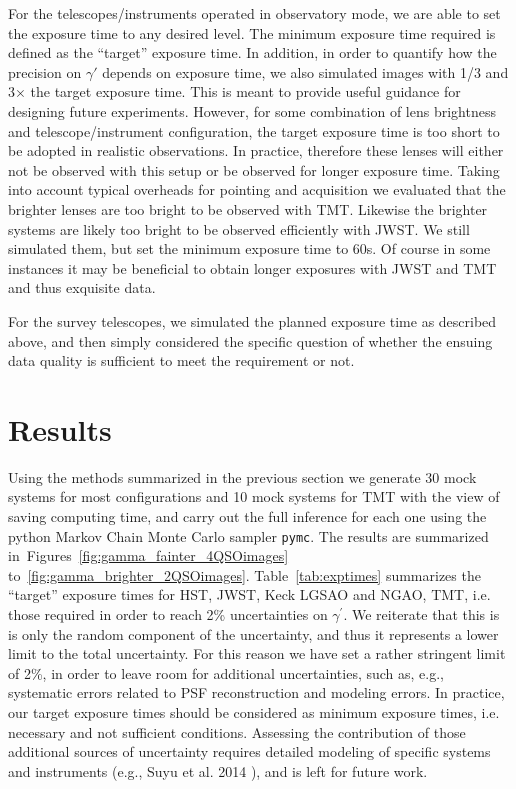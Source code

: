 \documentclass[a4paper,11pt]{article}
\begin{document}
For the telescopes/instruments operated in observatory mode, we are
able to set the exposure time to any desired level. The minimum
exposure time required is defined as the ``target'' exposure time. In
addition, in order to quantify how the precision on $\gamma'$ depends
on exposure time, we also simulated images with 1/3 and 3$\times$ the
target exposure time. This is meant to provide useful guidance for
designing future experiments. However, for some combination of lens
brightness and telescope/instrument configuration, the target exposure
time is too short to be adopted in realistic observations. In
practice, therefore these lenses will either not be observed with this
setup or be observed for longer exposure time. Taking into account
typical overheads for pointing and acquisition we evaluated that the
brighter lenses are too bright to be observed with TMT.  Likewise the
brighter systems are likely too bright to be observed efficiently with
JWST. We still simulated them, but set the minimum exposure time to
60s. Of course in some instances it may be beneficial to obtain longer
exposures with JWST and TMT and thus exquisite data.

For the survey telescopes, we simulated the planned exposure time as
described above, and then  simply considered the specific question of
whether the ensuing data quality is sufficient to meet the requirement
or not.

\section{Results}

Using the methods summarized in the previous section we generate 30
mock systems for most configurations and 10 mock systems for TMT with
the view of saving computing time, and carry out the full inference
for each one using the python Markov Chain Monte Carlo sampler
\texttt{pymc}.  The results are summarized
in~Figures~\ref{fig:gamma_fainter_4QSOimages}
to~\ref{fig:gamma_brighter_2QSOimages}. Table~\ref{tab:exptimes}
summarizes the ``target'' exposure times for HST, JWST, Keck LGSAO and
NGAO, TMT, i.e. those required in order to reach 2\% uncertainties on
$\gamma^{\prime}$.  We reiterate that this is is only the random
component of the uncertainty, and thus it represents a lower limit to
the total uncertainty. For this reason we have set a rather stringent
limit of 2\%, in order to leave room for additional uncertainties,
such as, e.g., systematic errors related to PSF reconstruction and
modeling errors.  In practice, our target exposure times should be
considered as minimum exposure times, i.e. necessary and not
sufficient conditions. Assessing the contribution of those additional
sources of uncertainty requires detailed modeling of specific systems
and instruments (e.g., Suyu et al. 2014 \cite{2014ApJ...788L..35S}),
and is left for future work.
\end{document}
